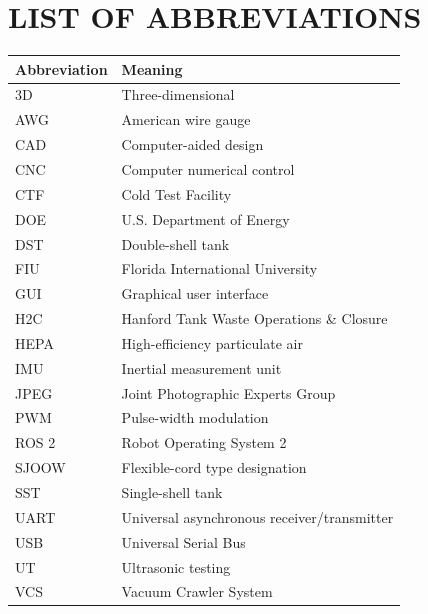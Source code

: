 \chapter*{LIST OF ABBREVIATIONS}
{}
\begingroup
\singlespacing
\renewcommand{\arraystretch}{1.4}
\noindent
\begin{tabularx}{\textwidth}{@{}p{}X@{}}
\textbf{Abbreviation} & \textbf{Meaning} \\
\midrule
3D & Three-dimensional \\
AWG & American wire gauge \\
CAD & Computer-aided design \\
CNC & Computer numerical control \\
CTF & Cold Test Facility \\
DOE & U.S. Department of Energy \\
DST & Double-shell tank \\
FIU & Florida International University \\
GUI & Graphical user interface \\
H2C & Hanford Tank Waste Operations \& Closure \\
HEPA & High-efficiency particulate air \\
IMU & Inertial measurement unit \\
JPEG & Joint Photographic Experts Group \\
PWM & Pulse-width modulation \\
ROS 2 & Robot Operating System 2 \\
SJOOW & Flexible-cord type designation \\
SST & Single-shell tank \\
UART & Universal asynchronous receiver/transmitter \\
USB & Universal Serial Bus \\
UT & Ultrasonic testing \\
VCS & Vacuum Crawler System \\
\end{tabularx}
\endgroup
\clearpage
